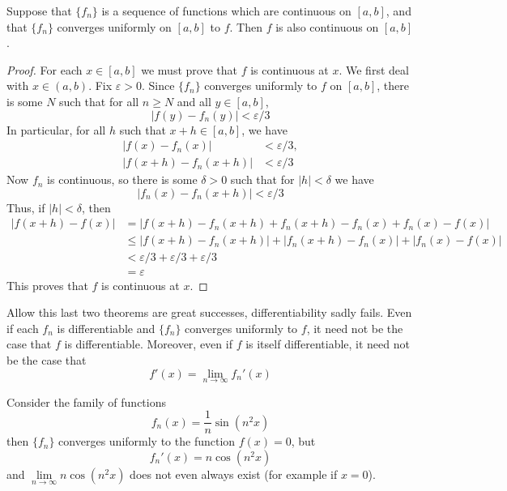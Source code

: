 \begin{thm}
    Suppose that $\{f_n\}$ is a sequence of functions which are continuous on $[a,b]$, and that $\{f_n\}$ converges uniformly on $[a,b]$ to $f$. Then $f$ is also continuous on $[a,b]$.
\end{thm}
\begin{proof}
    For each $x \in [a,b]$ we must prove that $f$ is continuous at $x$. We first deal with $x \in (a,b)$. Fix $\varepsilon > 0$. Since $\{f_n\}$ converges uniformly to $f$ on $[a,b]$, there is some $N$ such that for all $n \geq N$ and all $y \in [a,b]$, \begin{equation*}
        |f(y) - f_n(y)| < \varepsilon/3
    \end{equation*}
    In particular, for all $h$ such that $x+ h \in [a,b]$, we have \begin{align*}
        |f(x) - f_n(x)| &< \varepsilon/3, \\
        |f(x+h) - f_n(x+h)| &< \varepsilon/3
    \end{align*}
    Now $f_n$ is continuous, so there is some $\delta > 0$ such that for $|h| < \delta$ we have \begin{equation*}
        |f_n(x) - f_n(x+h)| < \varepsilon/3
    \end{equation*}
    Thus, if $|h| < \delta$, then \begin{align*}
        |f(x+h)-f(x)| &= |f(x+h)-f_n(x+h)+f_n(x+h) - f_n(x)+f_n(x)-f(x)| \\
        &\leq |f(x+h) - f_n(x+h)| + |f_n(x+h)-f_n(x)| + |f_n(x) - f(x)| \\
        &<\varepsilon/3 + \varepsilon/3 + \varepsilon/3 \\
        &= \varepsilon
    \end{align*}
    This proves that $f$ is continuous at $x$.
\end{proof}

\begin{rmk}
    Allow this last two theorems are great successes, differentiability sadly fails. Even if each $f_n$ is differentiable and $\{f_n\}$ converges uniformly to $f$, it need not be the case that $f$ is differentiable. Moreover, even if $f$ is itself differentiable, it need not be the case that \begin{equation*}
        f'(x) = \lim\limits_{n\rightarrow \infty}f_n'(x)
    \end{equation*}
\end{rmk}

\begin{eg}
    Consider the family of functions \begin{equation*}
        f_n(x) = \frac{1}{n}\sin(n^2x)
    \end{equation*}
    then $\{f_n\}$ converges uniformly to the function $f(x) = 0$, but \begin{equation*}
        f_n'(x) = n\cos(n^2x)
    \end{equation*}
    and $\lim\limits_{n\rightarrow\infty}n\cos(n^2x)$ does not even always exist (for example if $x =0$).
\end{eg}


